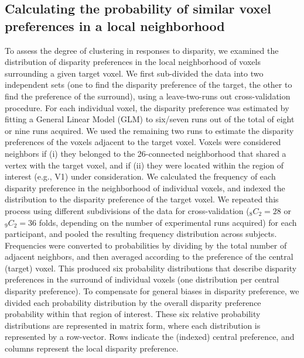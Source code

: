 \subsection{Calculating the probability of similar voxel preferences in a local neighborhood}
To assess the degree of clustering in responses to disparity, we examined the distribution of disparity preferences in the local neighborhood of voxels surrounding a given target voxel. We first sub-divided the data into two independent sets (one to find the disparity preference of the target, the other to find the preference of the surround), using a leave-two-runs out cross-validation procedure. For each individual voxel, the disparity preference was estimated by fitting a General Linear Model (GLM) to six/seven runs out of the total of eight or nine runs acquired. We used the remaining two runs to estimate the disparity preferences of the voxels adjacent to the target voxel. Voxels were considered neighbors if (i) they belonged to the 26-connected neighborhood that shared a vertex with the target voxel, and if (ii) they were located within the region of interest (e.g., V1) under consideration. We calculated the frequency of each disparity preference in the neighborhood of individual voxels, and indexed the distribution to the disparity preference of the target voxel. We repeated this process using different subdivisions of the data for cross-validation ($_8C_2 = 28$ or $_9C_2 = 36$ folds, depending on the number of experimental runs acquired) for each participant, and pooled the resulting frequency distribution across subjects. Frequencies were converted to probabilities by dividing by the total number of adjacent neighbors, and then averaged according to the preference of the central (target) voxel. This produced six probability distributions that describe disparity preferences in the surround of individual voxels (one distribution per central disparity preference). To compensate for general biases in disparity preference, we divided each probability distribution by the overall disparity preference probability within that region of interest. These six relative probability distributions are represented in matrix form, where each distribution is represented by a row-vector. Rows indicate the (indexed) central preference, and columns represent the local disparity preference.


